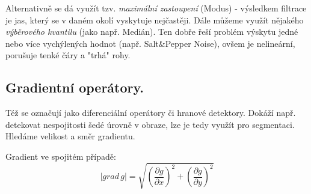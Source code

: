 Alternativně se dá využít tzv. \textit{maximální zastoupení} (Modus) - výsledkem filtrace je jas, který se v daném okolí vyskytuje nejčastěji. Dále můžeme využít nějakého \textit{výběrového kvantilu} (jako např. Medián). Ten dobře řeší problém výskytu jedné nebo více vychýlených hodnot (např. Salt\&Pepper Noise), ovšem je nelineární, porušuje tenké čáry a "trhá" rohy.

\subsection{Gradientní operátory.}
Též se označují jako diferenciální operátory či hranové detektory. Dokáží např. detekovat nespojitosti šedé úrovně v obraze, lze je tedy využít pro segmentaci. Hledáme velikost a směr gradientu.

Gradient ve spojitém případě:
\begin{equation}
|grad \, g| = \sqrt{\left( \frac{\partial g}{\partial x} \right)^2 + \left( \frac{\partial g}{\partial y} \right)^2}
\end{equation}

